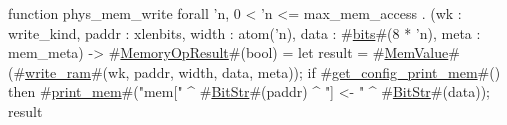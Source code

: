 function phys_mem_write forall 'n, 0 < 'n <= max_mem_access . (wk : write_kind, paddr : xlenbits, width : atom('n), data : #\hyperref[sailRISCVzbits]{bits}#(8 * 'n), meta : mem_meta) -> #\hyperref[sailRISCVzMemoryOpResult]{MemoryOpResult}#(bool) = {
  let result = #\hyperref[sailRISCVzMemValue]{MemValue}#(#\hyperref[sailRISCVzwritezyram]{write\_ram}#(wk, paddr, width, data, meta));
  if   #\hyperref[sailRISCVzgetzyconfigzyprintzymem]{get\_config\_print\_mem}#()
  then #\hyperref[sailRISCVzprintzymem]{print\_mem}#("mem[" ^ #\hyperref[sailRISCVzBitStr]{BitStr}#(paddr) ^ "] <- " ^ #\hyperref[sailRISCVzBitStr]{BitStr}#(data));
  result
}
